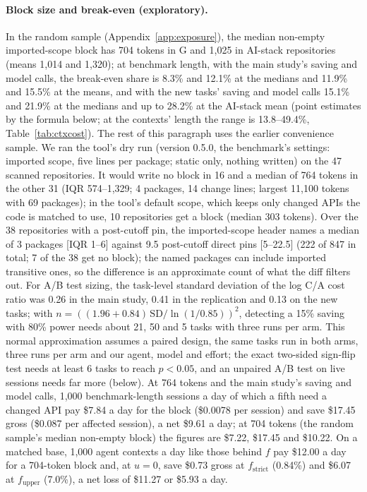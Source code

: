 \documentclass[11pt]{article}
\begin{document}
\paragraph{Block size and break-even (exploratory).}
In the random sample (Appendix~\ref{app:exposure}), the median non-empty imported-scope block has 704 tokens in G and 1,025 in AI-stack repositories (means 1,014 and 1,320); at benchmark length, with the main study's saving and model calls, the break-even share is 8.3\% and 12.1\% at the medians and 11.9\% and 15.5\% at the means, and with the new tasks' saving and model calls 15.1\% and 21.9\% at the medians and up to 28.2\% at the AI-stack mean (point estimates by the formula below; at the contexts' length the range is 13.8--49.4\%, Table~\ref{tab:ctxcost}).
The rest of this paragraph uses the earlier convenience sample.
We ran the tool's dry run (version 0.5.0, the benchmark's settings: imported scope, five lines per package; static only, nothing written) on the 47 scanned repositories. It would write no block in 16 and a median of 764 tokens in the other 31 (IQR 574--1,329; 4 packages, 14 change lines; largest 11,100 tokens with 69 packages); in the tool's default scope, which keeps only changed APIs the code is matched to use, 10 repositories get a block (median 303 tokens).
Over the 38 repositories with a post-cutoff pin, the imported-scope header names a median of 3 packages [IQR 1--6] against 9.5 post-cutoff direct pins [5--22.5] (222 of 847 in total; 7 of the 38 get no block); the named packages can include imported transitive ones, so the difference is an approximate count of what the diff filters out.
For A/B test sizing, the task-level standard deviation of the log C/A cost ratio was 0.26 in the main study, 0.41 in the replication and 0.13 on the new tasks; with $n = ((1.96 + 0.84)\,\mathrm{SD} / \ln(1/0.85))^2$, detecting a 15\% saving with 80\% power needs about 21, 50 and 5 tasks with three runs per arm. This normal approximation assumes a paired design, the same tasks run in both arms, three runs per arm and our agent, model and effort; the exact two-sided sign-flip test needs at least 6 tasks to reach $p<0.05$, and an unpaired A/B test on live sessions needs far more (below).
At 764 tokens and the main study's saving and model calls, 1,000 benchmark-length sessions a day of which a fifth need a changed API pay \$7.84 a day for the block (\$0.0078 per session) and save \$17.45 gross (\$0.087 per affected session), a net \$9.61 a day; at 704 tokens (the random sample's median non-empty block) the figures are \$7.22, \$17.45 and \$10.22. On a matched base, 1,000 agent contexts a day like those behind $f$ pay \$12.00 a day for a 704-token block and, at $u = 0$, save \$0.73 gross at $f_\text{strict}$ (0.84\%) and \$6.07 at $f_\text{upper}$ (7.0\%), a net loss of \$11.27 or \$5.93 a day.
\end{document}
